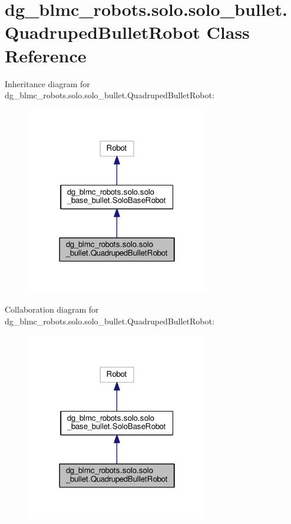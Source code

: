 \hypertarget{classdg__blmc__robots_1_1solo_1_1solo__bullet_1_1QuadrupedBulletRobot}{}\section{dg\+\_\+blmc\+\_\+robots.\+solo.\+solo\+\_\+bullet.\+Quadruped\+Bullet\+Robot Class Reference}
\label{classdg__blmc__robots_1_1solo_1_1solo__bullet_1_1QuadrupedBulletRobot}


Inheritance diagram for dg\+\_\+blmc\+\_\+robots.\+solo.\+solo\+\_\+bullet.\+Quadruped\+Bullet\+Robot\+:
\nopagebreak
\begin{figure}[H]
\begin{center}
\leavevmode
\includegraphics[width=226pt]{classdg__blmc__robots_1_1solo_1_1solo__bullet_1_1QuadrupedBulletRobot__inherit__graph}
\end{center}
\end{figure}


Collaboration diagram for dg\+\_\+blmc\+\_\+robots.\+solo.\+solo\+\_\+bullet.\+Quadruped\+Bullet\+Robot\+:
\nopagebreak
\begin{figure}[H]
\begin{center}
\leavevmode
\includegraphics[width=226pt]{classdg__blmc__robots_1_1solo_1_1solo__bullet_1_1QuadrupedBulletRobot__coll__graph}
\end{center}
\end{figure}
